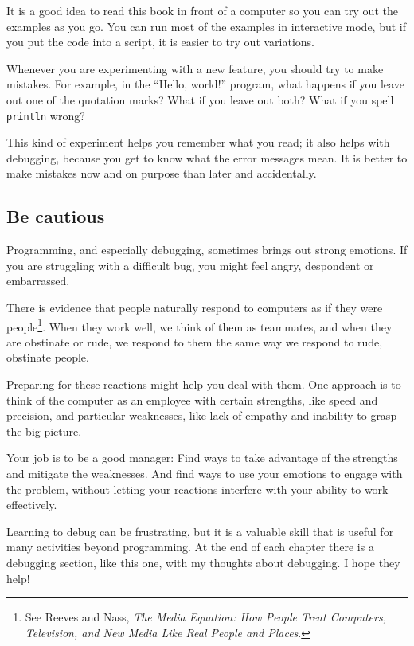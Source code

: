 \documentclass[10pt]{book}
\begin{document}

It is a good idea to read this book in front of a computer so you can try out the examples as you go.  You can run most of the examples in interactive mode, but if you put the code into a script, it is easier to try out variations.

Whenever you are experimenting with a new feature, you should try to make mistakes.  For example, in the ``Hello, world!'' program, what happens if you leave out one of the quotation marks?  What if you leave out both?  What if you spell {\tt println} wrong?


This kind of experiment helps you remember what you read; it also helps with debugging, because you get to know what the error messages mean. It is better to make mistakes now and on purpose than later and accidentally.

\subsection{Be cautious}

Programming, and especially debugging, sometimes brings out strong emotions.  If you are struggling with a difficult bug, you might feel angry, despondent or embarrassed.

There is evidence that people naturally respond to computers as if they were people\footnote{See Reeves and Nass, {\it The Media Equation: How People Treat Computers, Television, and New Media Like Real People and Places}.}.  When they work well, we think of them as teammates, and when they are obstinate or rude, we respond to them the same way we respond to rude, obstinate people.


Preparing for these reactions might help you deal with them. One approach is to think of the computer as an employee with certain strengths, like speed and precision, and particular weaknesses, like lack of empathy and inability to grasp the big picture.

Your job is to be a good manager: Find ways to take advantage of the strengths and mitigate the weaknesses.  And find ways to use your emotions to engage with the problem, without letting your reactions interfere with your ability to work effectively.

Learning to debug can be frustrating, but it is a valuable skill that is useful for many activities beyond programming.  At the end of each chapter there is a debugging section, like this one, with my thoughts about debugging.  I hope they help!
\end{document}
